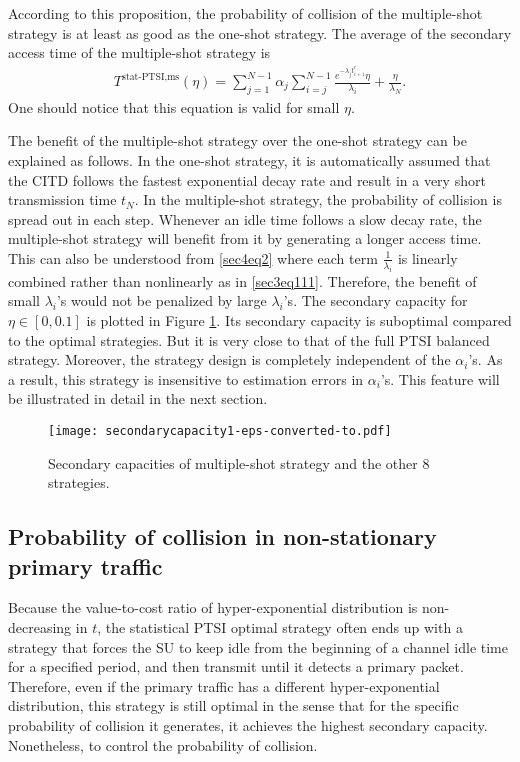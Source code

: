 \documentclass[10pt,final,journal,letterpaper]{IEEEtran}
\begin{document}
\par
According to this proposition, the probability of collision of the multiple-shot strategy is at least as good as the one-shot strategy. The average of the secondary access time of the multiple-shot strategy is
\begin{align}\label{sec4eq2}
    T^{\text{stat-PTSI,ms}}(\eta)=\sum_{j=1}^{N-1}\alpha_j\sum_{i=j}^{N-1}\frac{e^{-\lambda_jt_{i+1}^e}\eta}{\lambda_{i}}+\frac{\eta}{\lambda_N}.
\end{align}
One should notice that this equation is valid for small $\eta$.

\par
The benefit of the multiple-shot strategy over the one-shot strategy can be explained as follows. In the one-shot strategy, it is automatically assumed that the CITD follows the fastest exponential decay rate and result in a very short transmission time $t_N$. In the multiple-shot strategy, the probability of collision is spread out in each step. Whenever an idle time follows a slow decay rate, the multiple-shot strategy will benefit from it by generating a longer access time. This can also be understood from \eqref{sec4eq2} where each term $\frac{1}{\lambda_i}$ is linearly combined rather than nonlinearly as in \eqref{sec3eq111}. Therefore, the benefit of small $\lambda_i$'s would not be penalized by large $\lambda_i$'s. The secondary capacity for $\eta\in[0,0.1]$ is plotted in Figure \ref{fig:sc1}. Its secondary capacity is suboptimal compared to the optimal strategies. But it is very close to that of the full PTSI balanced strategy. Moreover, the strategy design is completely independent of the $\alpha_i$'s. As a result, this strategy is insensitive to estimation errors in $\alpha_i$'s. This feature will be illustrated in detail in the next section.
\begin{figure}[!t]
\centering
\texttt{[image: secondarycapacity1-eps-converted-to.pdf]}
\caption{Secondary capacities of multiple-shot strategy and the other 8 strategies.}
\label{fig:sc1}
\end{figure}

\subsection{Probability of collision in non-stationary primary traffic}
Because the value-to-cost ratio of hyper-exponential distribution is non-decreasing in $t$, the statistical PTSI optimal strategy often ends up with a strategy that forces the SU to keep idle from the beginning of a channel idle time for a specified period, and then transmit until it detects a primary packet. Therefore, even if the primary traffic has a different hyper-exponential distribution, this strategy is still optimal in the sense that for the specific probability of collision it generates, it achieves the highest secondary capacity. Nonetheless, to control the probability of collision.
\end{document}
